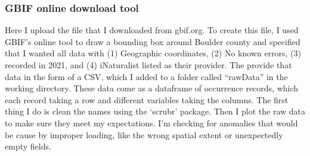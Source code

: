 \documentclass[
]{article}
\newenvironment{Shaded}{\begin{snugshade}}{\end{snugshade}}
\newcommand{\DataTypeTok}[1]{\textcolor[rgb]{0.13,0.29,0.53}{#1}}
\newcommand{\DecValTok}[1]{\textcolor[rgb]{0.00,0.00,0.81}{#1}}
\newcommand{\KeywordTok}[1]{\textcolor[rgb]{0.13,0.29,0.53}{\textbf{#1}}}
\newcommand{\NormalTok}[1]{#1}
\newcommand{\OperatorTok}[1]{\textcolor[rgb]{0.81,0.36,0.00}{\textbf{#1}}}
\newcommand{\OtherTok}[1]{\textcolor[rgb]{0.56,0.35,0.01}{#1}}
\newcommand{\StringTok}[1]{\textcolor[rgb]{0.31,0.60,0.02}{#1}}
\begin{document}
\begin{Shaded}
\end{Shaded}

\hypertarget{gbif-online-download-tool}{%
\subsubsection{GBIF online download
tool}\label{gbif-online-download-tool}}

Here I upload the file that I downloaded from gbif.org. To create this
file, I used GBIF's online tool to draw a bounding box around Boulder
county and specified that I wanted all data with (1) Geographic
coordinates, (2) No known errors, (3) recorded in 2021, and (4)
iNaturalist listed as their provider. The provide that data in the form
of a CSV, which I added to a folder called ``rawData'' in the working
directory. These data come as a dataframe of occurrence records, which
each record taking a row and different variables taking the columns. The
first thing I do is clean the names using the `scrubr' package. Then I
plot the raw data to make sure they meet my expectations. I'm checking
for anomalies that would be cause by improper loading, like the wrong
spatial extent or unexpectedly empty fields.

\begin{Shaded}
\end{Shaded}
\end{document}
